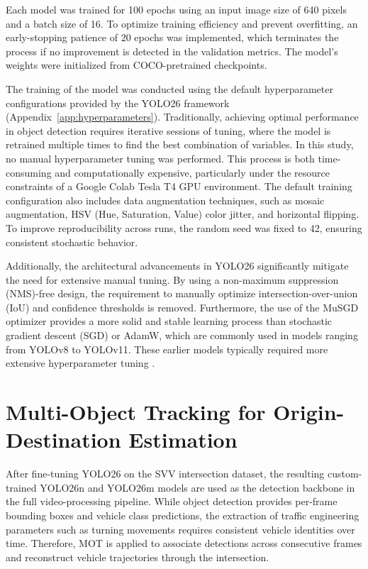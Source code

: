 Each model was trained for 100 epochs using an input image size of 640 pixels and a batch size of 16. To optimize training efficiency and prevent overfitting, an early-stopping patience of 20 epochs was implemented, which terminates the process if no improvement is detected in the validation metrics. The model’s weights were initialized from COCO-pretrained checkpoints.

The training of the model was conducted using the default hyperparameter configurations provided by the YOLO26 framework (Appendix~\ref{app:hyperparameters}). Traditionally, achieving optimal performance in object detection requires iterative  sessions of tuning, where the model is retrained multiple times to find the best combination of variables. In this study, no manual hyperparameter tuning was performed. This process is both time-consuming and computationally expensive, particularly under the resource constraints of a Google Colab Tesla T4 GPU environment. The default training configuration also includes data augmentation techniques, such as mosaic augmentation, HSV (Hue, Saturation, Value) color jitter, and horizontal flipping. To improve reproducibility across runs, the random seed was fixed to 42, ensuring consistent stochastic behavior. 

Additionally, the architectural advancements in YOLO26 significantly mitigate the need for extensive manual tuning. By using a non-maximum suppression (NMS)-free design, the requirement to manually optimize intersection-over-union (IoU) and confidence thresholds is removed. Furthermore, the use of the MuSGD optimizer provides a more solid and stable learning process than stochastic gradient descent (SGD) or AdamW, which are commonly used in models ranging from YOLOv8 to YOLOv11. These earlier models typically required more extensive hyperparameter tuning \citep{sapkota2026yolo26keyarchitecturalenhancements}.

\section{Multi-Object Tracking for Origin-Destination Estimation}
\label{sec:method_tracking_od}

After fine-tuning YOLO26 on the SVV intersection dataset, the resulting custom-trained YOLO26n and YOLO26m models are used as the detection backbone in the full video-processing pipeline. While object detection provides per-frame bounding boxes and vehicle class predictions, the extraction of traffic engineering parameters such as turning movements requires consistent vehicle identities over time. Therefore, MOT is applied to associate detections across consecutive frames and reconstruct vehicle trajectories through the intersection.

